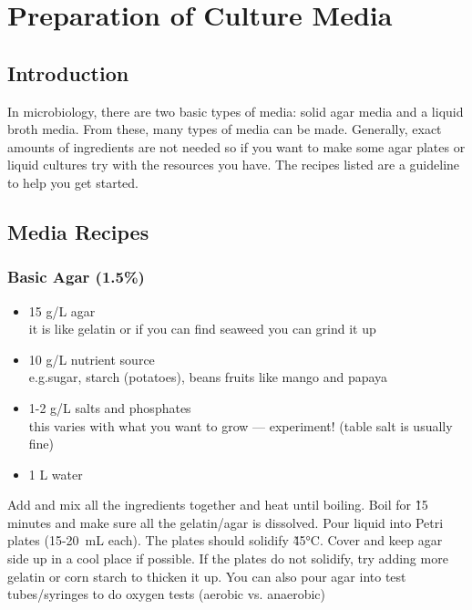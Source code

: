 \chapter{Preparation of Culture Media} 

\section{Introduction}

In microbiology, there are two basic types of media: solid agar media and a liquid broth media. From these, many types of media can be made. Generally, exact amounts of ingredients are not needed so if you want to make some agar plates or liquid cultures try with the resources you have. The recipes listed are a guideline to help you get started.

\section{Media Recipes}

\subsection{Basic Agar (1.5\%)}

\begin{itemize}

\item{15 g/L agar\\
it is like gelatin or if you can find seaweed you can grind it up}

\item{10 g/L nutrient source\\
e.g.sugar, starch (potatoes), beans fruits like mango and papaya}

\item{1-2 g/L salts and phosphates\\
this varies with what you want to grow — experiment! (table salt is usually fine)}

\item{1 L water}

\end{itemize}

Add and mix all the ingredients together and heat until boiling. Boil for \~15 minutes and make sure all the gelatin/agar is dissolved. Pour liquid into Petri plates (15-20~mL each). The plates should solidify \~45°C. Cover and keep agar side up in a cool place if possible. If the plates do not solidify, try adding more gelatin or corn starch to thicken it up. You can also pour agar into test tubes/syringes to do oxygen tests (aerobic vs. anaerobic)

